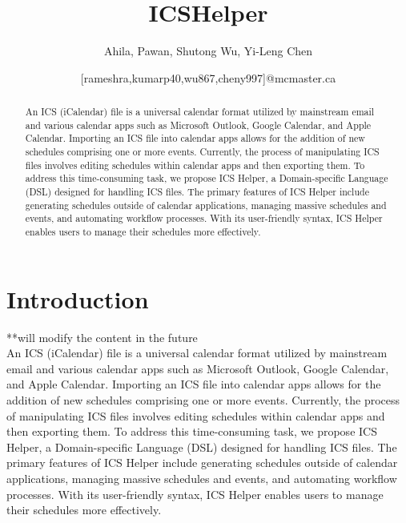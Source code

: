 \documentclass[12pt, letterpaper, twoside]{article}
\title{\textbf{ICSHelper}} %
\author{Ahila, Pawan, Shutong Wu, Yi-Leng Chen \and [rameshra,kumarp40,wu867,cheny997]@mcmaster.ca} %
\begin{document}
\maketitle

\begin{abstract}
    \noindent
    An ICS (iCalendar) file is a universal calendar format utilized by mainstream email and various calendar apps such as Microsoft Outlook, Google Calendar, and Apple Calendar. Importing an ICS file into calendar apps allows for the addition of new schedules comprising one or more events. Currently, the process of manipulating ICS files involves editing schedules within calendar apps and then exporting them. To address this time-consuming task, we propose ICS Helper, a Domain-specific Language (DSL) designed for handling ICS files. The primary features of ICS Helper include generating schedules outside of calendar applications, managing massive schedules and events, and automating workflow processes. With its user-friendly syntax, ICS Helper enables users to manage their schedules more effectively.
\end{abstract}

\vspace{2.5cm}


\thispagestyle{firstpage}

\pagebreak

\newgeometry{} %

\section{Introduction}
\label{sec:intro}

**will modify the content in the future\\
    An ICS (iCalendar) file is a universal calendar format utilized by mainstream email and various calendar apps such as Microsoft Outlook, Google Calendar, and Apple Calendar. Importing an ICS file into calendar apps allows for the addition of new schedules comprising one or more events. Currently, the process of manipulating ICS files involves editing schedules within calendar apps and then exporting them. To address this time-consuming task, we propose ICS Helper, a Domain-specific Language (DSL) designed for handling ICS files. The primary features of ICS Helper include generating schedules outside of calendar applications, managing massive schedules and events, and automating workflow processes. With its user-friendly syntax, ICS Helper enables users to manage their schedules more effectively.
\newpage
\end{document}
